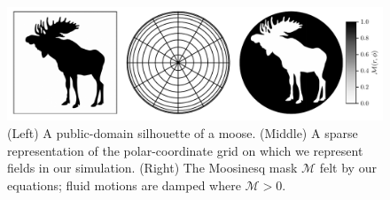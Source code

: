 \begin{figure}[t!]
\centering
\includegraphics[width=\textwidth]{paper_figure01.pdf}
    \caption{ 
        (Left) A public-domain silhouette of a moose.
        (Middle) A sparse representation of the polar-coordinate grid on which we represent fields in our simulation.
        (Right) The Moosinesq mask $\mathcal{M}$ felt by our equations; fluid motions are damped where $\mathcal{M} > 0$.
        \label{fig:methods}
    }
\end{figure}
